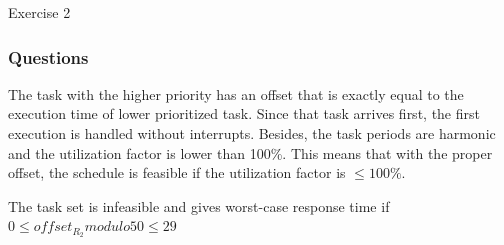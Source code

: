 \begin{homeworkProblem}
\begin{homeworkSection}{Exercise 2}
\subsubsection{Questions}
The task with the higher priority has an offset that is exactly equal to the execution time of lower prioritized task. 
Since that task arrives first, the first execution is handled without interrupts. 
Besides, the task periods are harmonic and the utilization factor is lower than 100\%. This means that with the proper offset, the schedule is feasible if the utilization factor is $\leq 100\%$.

The task set is infeasible and gives worst-case response time if $0 \leq offset_{R_2} modulo 50 \leq 29$

\end{homeworkSection}

\end{homeworkProblem} 